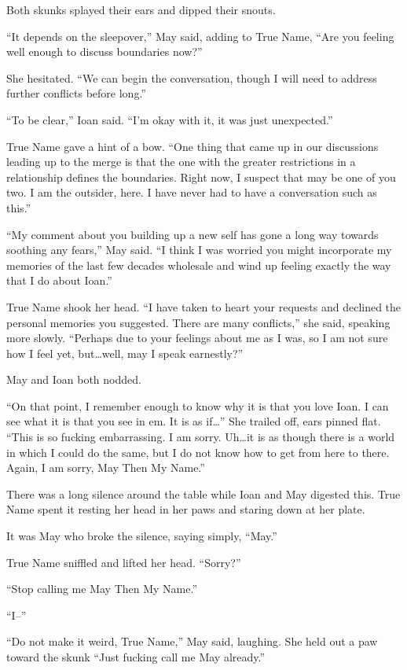 Both skunks splayed their ears and dipped their snouts.

``It depends on the sleepover,'' May said, adding to True Name, ``Are you feeling well enough to discuss boundaries now?''

She hesitated. ``We can begin the conversation, though I will need to address further conflicts before long.''

``To be clear,'' Ioan said. ``I'm okay with it, it was just unexpected.''

True Name gave a hint of a bow. ``One thing that came up in our discussions leading up to the merge is that the one with the greater restrictions in a relationship defines the boundaries. Right now, I suspect that may be one of you two. I am the outsider, here. I have never had to have a conversation such as this.''

``My comment about you building up a new self has gone a long way towards soothing any fears,'' May said. ``I think I was worried you might incorporate my memories of the last few decades wholesale and wind up feeling exactly the way that I do about Ioan.''

True Name shook her head. ``I have taken to heart your requests and declined the personal memories you suggested. There are many conflicts,'' she said, speaking more slowly. ``Perhaps due to your feelings about me as I was, so I am not sure how I feel yet, but\ldots well, may I speak earnestly?''

May and Ioan both nodded.

``On that point, I remember enough to know why it is that you love Ioan. I can see what it is that you see in em. It is as if\ldots{}'' She trailed off, ears pinned flat. ``This is so fucking embarrassing. I am sorry. Uh\ldots it is as though there is a world in which I could do the same, but I do not know how to get from here to there. Again, I am sorry, May Then My Name.''

There was a long silence around the table while Ioan and May digested this. True Name spent it resting her head in her paws and staring down at her plate.

It was May who broke the silence, saying simply, ``May.''

True Name sniffled and lifted her head. ``Sorry?''

``Stop calling me May Then My Name.''

``I--''

``Do not make it weird, True Name,'' May said, laughing. She held out a paw toward the skunk ``Just fucking call me May already.''

